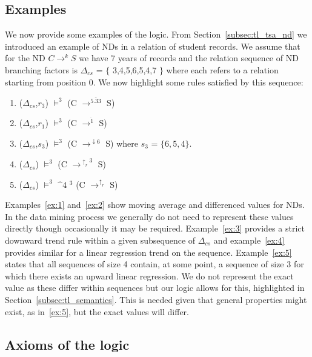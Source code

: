 \subsection{Examples}

We now provide some examples of the logic. From
Section~\ref{subsec:tl_tsa_nd} we introduced an example of NDs in a relation
of student records. We assume that for the ND $C \to^k S$ we have 7
years of records and the relation sequence of ND branching factors is
$\Delta_{cs}$ = $\{$ 3,4,5,6,5,4,7 $\}$ where each refers to a
relation starting from 
position 0. We now highlight some rules satisfied by this sequence:

\begin{enumerate}
\item\label{ex:1} ($\Delta_{cs}$,$r_3$) $\models^3$ (C $\to^{\bar{5.33}}$ S)
\item\label{ex:2} ($\Delta_{cs}$,$r_1$) $\models^3$ (C $\to^{\ddot{1}}$ S)
\item\label{ex:3} ($\Delta_{cs}$,$s_3$) $\models^3$ (C
$\to^{\downarrow{6}}$ S) where $s_3$ = $\{ 6,5,4 \}$.
\item\label{ex:4} ($\Delta_{cs}$) $\models^3$ (C $\to^{\uparrow_r{3}}$ S)
\item\label{ex:5} ($\Delta_{cs}$) $\models^3$ $\bm^4$ \diam$^3$ (C
$\to^{\uparrow_r}$ S)
\end{enumerate}

Examples~\ref{ex:1} and~\ref{ex:2} show moving average and differenced
values for NDs. In the data mining process we generally do not need to
represent these values directly though occasionally it may be
required. Example~\ref{ex:3} provides a strict downward trend rule
within a given subsequence of $\Delta_{cs}$ and example~\ref{ex:4}
provides similar for a linear regression trend on the
sequence. Example~\ref{ex:5} states that all sequences of size 4
contain, at some point, a sequence of size 3 for which there exists an
upward linear regression. We do not represent the exact value as these
differ within sequences but our logic allows for this, highlighted in Section~\ref{subsec:tl_semantics}. This is needed
given that general properties might 
exist, as in~\ref{ex:5}, but the exact values will differ.

\subsection{Axioms of the logic}\label{subsec:tl_axioms}

